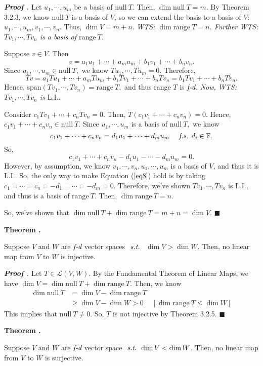 \documentclass[11pt, letterpaper]{article}
\newcounter{index}[subsection]
\newenvironment*{thm}[1]{\begin{tcolorbox}\par\noindent\textbf{Theorem \thesubsection.\stepcounter{index}\theindex\ #1} \par}{\par\end{tcolorbox}}
\newcounter{nprf}[subsection]
\newenvironment*{prf}{\par\indent\textbf{\textit{Proof \stepcounter{nprf}\thenprf.}}}{\hfill$\blacksquare$\par}
\def\F{\mathbb{F}}
\def\L{\mathcal{L}}
\def\st{\emph{ s.t. }}
\def\fs{\emph{ f.s. }}
\def\LI{\mathrm{L.I.}}
\def\FD{\emph{f-d}}
\def\span{\mathrm{span}}
\def\Null{\mathrm{null\ }}
\def\range{\mathrm{range\ }}
\begin{document}
\begin{prf}
	Let $u_1,\cdots,u_m$ be a basis of $\Null T.$ Then, $\dim\Null T=m.$ By Theorem 3.2.3, we know $\Null T$ is a basis of $V$, so we can extend the basis to a basis of $V$: $u_1,\cdots,u_m,v_1,\cdots,v_n$. Thus, $\dim V=m+n$. \textit{WTS: $\dim\range T=n$. Further WTS: $Tv_1,\cdots,Tv_n$ is a basis of $\range T$.}\par 
	Suppose $v\in V.$ Then \[v=a_1u_1+\cdots+a_mu_m+b_1v_1+\cdots+b_nv_n.\] Since $u_1,\cdots,u_m\in\Null T,$ we know $Tu_1,\cdots,Tu_m=0.$ Therefore, \[Tv=a_1Tu_1+\cdots+a_mTu_m+b_1Tv_1+\cdots+b_nTv_n=b_1Tv_1+\cdots+b_nTv_n.\] Hence, $\span(Tv_1,\cdots,Tv_n)=\range T,$ and thus range $T$ is $\FD$. \textit{Now, WTS: $Tv_1,\cdots,Tv_n$ is $\LI$.}\par 
	Consider $c_1Tv_1+\cdots+c_nTv_n=0.$ Then, $T(c_1v_1+\cdots+c_nv_n)=0.$ Hence, $c_1v_1+\cdots+c_nv_n\in\Null T.$ Since $u_1,\cdots,u_m$ is a basis of $\Null T,$ we know \[c_1v_1+\cdots+c_nv_n=d_1u_1+\cdots+d_mu_m\quad\fs d_i\in\F.\] So, \begin{equation}\label{eq8}c_1v_1+\cdots+c_nv_n-d_1u_1-\cdots-d_mu_m=0.\end{equation} However, by assumption, we know $v_1,\cdots,v_n,u_1,\cdots,u_m$ is a basis of $V$, and thus it is $\LI.$ So, the only way to make Equation (\ref{eq8}) hold is by taking $c_1=\cdots=c_n=-d_1=\cdots=-d_m=0.$ Therefore, we've shown $Tv_1,\cdots,Tv_n$ is $\LI$, and thus is a basis of $\range T.$ Then, $\dim\range T=n.$\par 
	So, we've shown that $\dim\Null T+\dim\range T=m+n=\dim V.$
\end{prf}
\begin{thm}{}
	Suppose $V$ and $W$ are $\FD$ vector spaces $\st$ $\dim V>\dim W.$ Then, no linear map from $V$ to $W$ is injective.
\end{thm}
\begin{prf}
	Let $T\in\L(V,W)$. By the Fundamental Theorem of Linear Maps, we have $\dim V=\dim\Null T+\dim\range T$. Then, we know \[\begin{aligned}\dim\Null T&=\dim V-\dim\range T\\&\geq\dim V-\dim W>0&[\dim\range T\leq\dim W]\end{aligned}\] This implies that $\Null T\neq\qty{0}.$ So, $T$ is not injective by Theorem 3.2.5.
\end{prf}
\begin{thm}{}
	Suppose $V$ and $W$ are $\FD$ vector space $\st \dim V<\dim W$. Then, no linear map from $V$ to $W$ is surjective.	
\end{thm}
\end{document}
